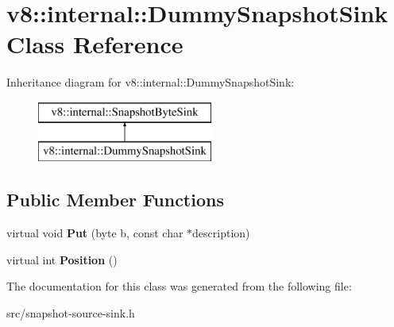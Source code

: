 \hypertarget{classv8_1_1internal_1_1_dummy_snapshot_sink}{}\section{v8\+:\+:internal\+:\+:Dummy\+Snapshot\+Sink Class Reference}
\label{classv8_1_1internal_1_1_dummy_snapshot_sink}
Inheritance diagram for v8\+:\+:internal\+:\+:Dummy\+Snapshot\+Sink\+:\begin{figure}[H]
\begin{center}
\leavevmode
\includegraphics[height=2.000000cm]{classv8_1_1internal_1_1_dummy_snapshot_sink}
\end{center}
\end{figure}
\subsection*{Public Member Functions}
\begin{DoxyCompactItemize}
\item 
\hypertarget{classv8_1_1internal_1_1_dummy_snapshot_sink_a4a9f6828c8cac15ae0dabcdaca0768e7}{}virtual void {\bfseries Put} (byte b, const char $\ast$description)\label{classv8_1_1internal_1_1_dummy_snapshot_sink_a4a9f6828c8cac15ae0dabcdaca0768e7}

\item 
\hypertarget{classv8_1_1internal_1_1_dummy_snapshot_sink_af796116451ffd253d80d15812b1b74f3}{}virtual int {\bfseries Position} ()\label{classv8_1_1internal_1_1_dummy_snapshot_sink_af796116451ffd253d80d15812b1b74f3}

\end{DoxyCompactItemize}


The documentation for this class was generated from the following file\+:\begin{DoxyCompactItemize}
\item 
src/snapshot-\/source-\/sink.\+h\end{DoxyCompactItemize}
